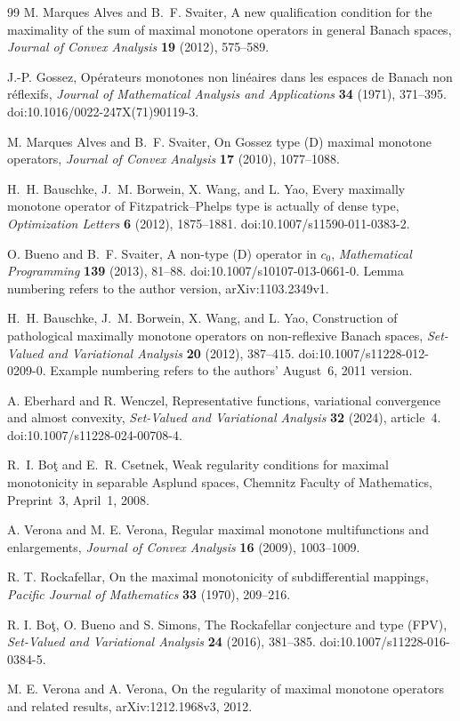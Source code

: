 \begin{thebibliography}{99}
M. Marques Alves and B.~F. Svaiter,
A new qualification condition for the maximality of the sum of maximal
monotone operators in general Banach spaces,
\emph{Journal of Convex Analysis} \textbf{19} (2012), 575--589.

J.-P. Gossez,
Op\'{e}rateurs monotones non lin\'{e}aires dans les espaces de Banach non r\'{e}flexifs,
\emph{Journal of Mathematical Analysis and Applications}
\textbf{34} (1971), 371--395.
doi:10.1016/0022-247X(71)90119-3.

M. Marques Alves and B.~F. Svaiter,
On Gossez type (D) maximal monotone operators,
\emph{Journal of Convex Analysis} \textbf{17} (2010), 1077--1088.

H.~H. Bauschke, J.~M. Borwein, X. Wang, and L. Yao,
Every maximally monotone operator of Fitzpatrick--Phelps type is actually
of dense type,
\emph{Optimization Letters} \textbf{6} (2012), 1875--1881.
doi:10.1007/s11590-011-0383-2.

O. Bueno and B.~F. Svaiter,
A non-type (D) operator in $c_0$,
\emph{Mathematical Programming} \textbf{139} (2013), 81--88.
doi:10.1007/s10107-013-0661-0.
Lemma numbering refers to the author version, arXiv:1103.2349v1.

H.~H. Bauschke, J.~M. Borwein, X. Wang, and L. Yao,
Construction of pathological maximally monotone operators on
non-reflexive Banach spaces,
\emph{Set-Valued and Variational Analysis} \textbf{20} (2012), 387--415.
doi:10.1007/s11228-012-0209-0.
Example numbering refers to the authors' August~6, 2011 version.

A. Eberhard and R. Wenczel,
Representative functions, variational convergence and almost convexity,
\emph{Set-Valued and Variational Analysis} \textbf{32} (2024), article~4.
doi:10.1007/s11228-024-00708-4.

R.~I. Bo\c{t} and E.~R. Csetnek,
Weak regularity conditions for maximal monotonicity in separable
Asplund spaces,
Chemnitz Faculty of Mathematics, Preprint~3, April~1, 2008.

A. Verona and M. E. Verona,
Regular maximal monotone multifunctions and enlargements,
\emph{Journal of Convex Analysis} \textbf{16} (2009), 1003--1009.

R. T. Rockafellar,
On the maximal monotonicity of subdifferential mappings,
\emph{Pacific Journal of Mathematics} \textbf{33} (1970), 209--216.

R. I. Bo\c{t}, O. Bueno and S. Simons,
The Rockafellar conjecture and type (FPV),
\emph{Set-Valued and Variational Analysis} \textbf{24} (2016), 381--385.
doi:10.1007/s11228-016-0384-5.

M. E. Verona and A. Verona,
On the regularity of maximal monotone operators and related results,
arXiv:1212.1968v3, 2012.

\end{thebibliography}


